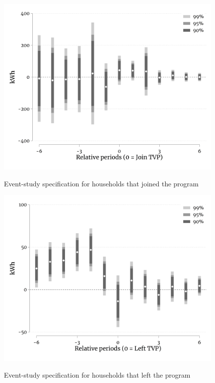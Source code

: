 \clearpage


\begin{figure}[ht]
  \caption{Event-study specification for households that joined the program}\label{fig:two}
  \begin{center}
  {\includegraphics[width=1\textwidth]{./figures/eventStudyType1-2_6months.png}}
  \end{center}
\end{figure}

\clearpage


\begin{figure}[ht]
  \caption{Event-study specification for households that left the program}\label{fig:three}
  \begin{center}
  {\includegraphics[width=1\textwidth]{./figures/eventStudyType3_6months.png}}
  \end{center}
\end{figure}

